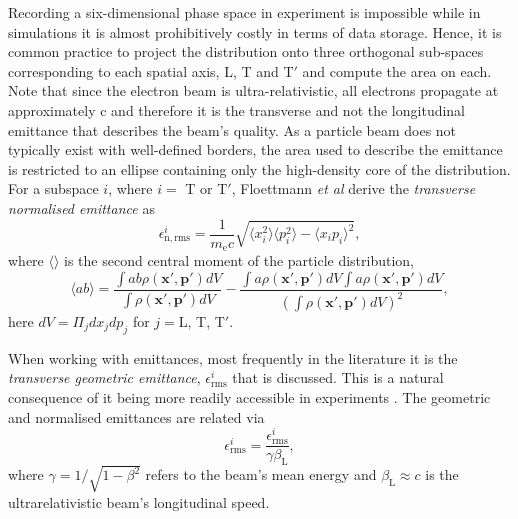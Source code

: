 Recording a six-dimensional phase space in experiment is impossible while in simulations it is almost prohibitively costly in terms of data storage. Hence, it is common practice to project the distribution onto three orthogonal sub-spaces corresponding to each spatial axis, L, T and T$'$ and compute the area on each. Note that since the electron beam is ultra-relativistic, all electrons propagate at approximately c and therefore it is the transverse and not the longitudinal emittance that describes the beam's quality. As a particle beam does not typically exist with well-defined borders, the area used to describe the emittance is restricted to an ellipse containing only the high-density core of the distribution. For a subspace $i$, where $i = $ T or T$'$, Floettmann \textit{et al} \cite{floettmannBasicFeaturesBeam2003} derive the \textit{transverse normalised emittance} as
\begin{equation}\label{eq:app_epsilon_n}
	\epsilon^i_\mathrm{n,rms} = \frac{1}{m_\mathrm{e}c} \sqrt{\langle x^2_i\rangle\langle p^2_i\rangle - \langle x_ip_i\rangle^2},
\end{equation}
where $\langle\rangle$ is the second central moment of the particle distribution,
\begin{equation}
	\langle ab \rangle = \frac{\int ab\rho(\mathbf{x}',\mathbf{p}')dV}{\int \rho (\mathbf{x}',\mathbf{p}')dV} - \frac{\int a\rho(\mathbf{x}',\mathbf{p}')dV\int a\rho(\mathbf{x}',\mathbf{p}')dV}{(\int \rho (\mathbf{x}',\mathbf{p}')dV)^2},
\end{equation}
here $dV = \Pi_jdx_jdp_j$ for $j = $L, T, T$'$.

When working with emittances, most frequently in the literature it is the \textit{transverse geometric emittance}, $\epsilon^i_\mathrm{rms}$ that is discussed. This is a natural consequence of it being more readily accessible in experiments \cite{mcdonaldMethodsEmittanceMeasurement1989}. The geometric and normalised emittances are related via
\begin{equation}
	\epsilon^i_\mathrm{rms} = \frac{\epsilon^i_\mathrm{rms}}{\gamma \beta_\mathrm{L}},
\end{equation}
where $\gamma = 1/\sqrt{1-\beta^2}$ refers to the beam's mean energy and $\beta_\mathrm{L} \approx c$ is the ultrarelativistic beam's longitudinal speed.

